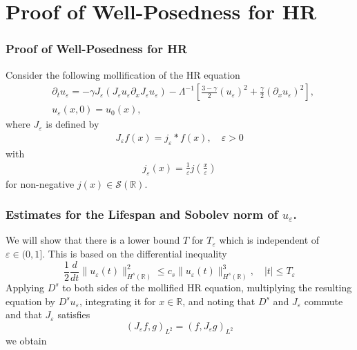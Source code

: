 \documentclass{beamer}
\newcommand{\rr}{\mathbb{R}}
\newcommand{\p}{\partial}
\newcommand{\ee}{\varepsilon}
\begin{document}
\section{Proof of Well-Posedness for HR}
\begin{frame}[allowframebreaks]
	\frametitle{Proof of Well-Posedness for HR}
%
%
%
%
%
%
%
%
%
%
Consider the following mollification of the HR equation
%
%
\begin{align*}
& \p_t  u_\ee =
-\gamma J_\ee(J_\ee u_\ee \partial_x  J_\ee  u_\ee) - \Lambda^{-1} \left 
[\frac{3-\gamma}{2}(u_\ee)^2 + \frac{\gamma}{2}(\p_x u_\ee)^2 \right ],
\\
& u_\ee(x, 0) = u_0 (x),
\label{hr-moli-data}
\end{align*}
%
% 
%
%
%
%
%
%
where $J_\ee$ is defined  by
%
\begin{equation*}
\begin{split}
J_\ee f(x) = j_\ee * f(x), \quad \ee>0
\end{split}
\end{equation*}
%
with 
%
\begin{equation*}
\begin{split}
j_\ee(x) = \frac{1}{\ee}j\left( \frac{x}{\ee} \right)
\end{split}
\end{equation*}
%
for non-negative $j(x) \in
\mathcal{S}(\rr)$.
\end{frame}
%
%
%
%

\begin{frame}
\frametitle{Estimates for the Lifespan and Sobolev norm of $u_\ee$.}
%
We will show that there is a lower bound  $T$
for $T_\ee$ which is independent of $\ee\in(0, 1]$.
This is based on the differential
inequality 
%
%
%
\begin{equation*} \label{B-diff-ineq}
\frac 12
\frac{d}{dt}
\|u_\ee(t)\|_{H^{s}(\rr)}^2
\le
c_s
\|u_\ee(t)\|_{H^{s}(\rr)}^3,
\quad
|t| \le T_\ee
\end{equation*}
%
%
%
%
%
%
%
Applying $D^s$ to both sides of the mollified HR equation,
multiplying the resulting equation by $D^s u_\ee$,
integrating it for $x\in\rr$, and noting that 
$D^s$ and $J_\ee$ commute
and that  $J_\ee$ satisfies 
%
%
\begin{equation*} 
\label{J-e-inner-prod-property}
(J_\ee f, g)_{L^2}=( f, J_\ee g)_{L^2}
\end{equation*}
%
%
we obtain

\end{frame}
\end{document}
